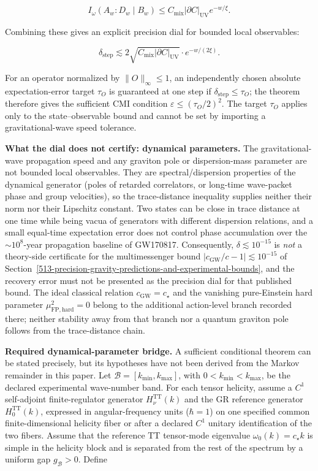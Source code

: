 \[
I_\omega(A_w : D_w \mid B_w)
\le C_{\mathrm{mix}} |\partial C|_{\mathrm{UV}} e^{-w/\xi}.
\]

Combining these gives an explicit precision dial for bounded local observables:

\[
\delta_{\mathrm{step}} \lesssim 2\sqrt{C_{\mathrm{mix}} |\partial C|_{\mathrm{UV}}}
\cdot e^{-w/(2\xi)}.
\]

For an operator normalized by \(\|O\|_\infty\le1\), an independently chosen absolute expectation-error target \(\tau_O\) is guaranteed at one step if \(\delta_{\mathrm{step}}\le\tau_O\); the theorem therefore gives the sufficient CMI condition \(\varepsilon\le(\tau_O/2)^2\). The target \(\tau_O\) applies only to the state--observable bound and cannot be set by importing a gravitational-wave speed tolerance.

\textbf{What the dial does not certify: dynamical parameters.} The gravitational-wave propagation speed and any graviton pole or dispersion-mass parameter are not bounded local observables. They are spectral/dispersion properties of the dynamical generator (poles of retarded correlators, or long-time wave-packet phase and group velocities), so the trace-distance inequality supplies neither their norm nor their Lipschitz constant. Two states can be close in trace distance at one time while being vacua of generators with different dispersion relations, and a small equal-time expectation error does not control phase accumulation over the \(\sim 10^8\)-year propagation baseline of GW170817. Consequently, \(\delta \lesssim 10^{-15}\) is \emph{not} a theory-side certificate for the multimessenger bound \(|c_{\mathrm{GW}}/c - 1| \lesssim 10^{-15}\) of Section~\ref{513-precision-gravity-predictions-and-experimental-bounds}, and the recovery error must not be presented as the precision dial for that published bound. The ideal classical relation \(c_{\mathrm{GW}}=c_\star\) and the vanishing pure-Einstein hard parameter \(\mu_{\mathrm{FP,hard}}^2=0\) belong to the additional action-level branch recorded there; neither stability away from that branch nor a quantum graviton pole follows from the trace-distance chain.

\textbf{Required dynamical-parameter bridge.} A sufficient conditional theorem can be stated precisely, but its hypotheses have not been derived from the Markov remainder in this paper. Let \(\mathcal B=[k_{\min},k_{\max}]\), with \(0<k_{\min}<k_{\max}\), be the declared experimental wave-number band. For each tensor helicity, assume a \(C^1\) self-adjoint finite-regulator generator \(H_\nu^{\mathrm{TT}}(k)\) and the GR reference generator \(H_0^{\mathrm{TT}}(k)\), expressed in angular-frequency units (\(\hbar=1\)) on one specified common finite-dimensional helicity fiber or after a declared \(C^1\) unitary identification of the two fibers. Assume that the reference TT tensor-mode eigenvalue \(\omega_0(k)=c_\star k\) is simple in the helicity block and is separated from the rest of the spectrum by a uniform gap \(g_{\mathcal B}>0\). Define

